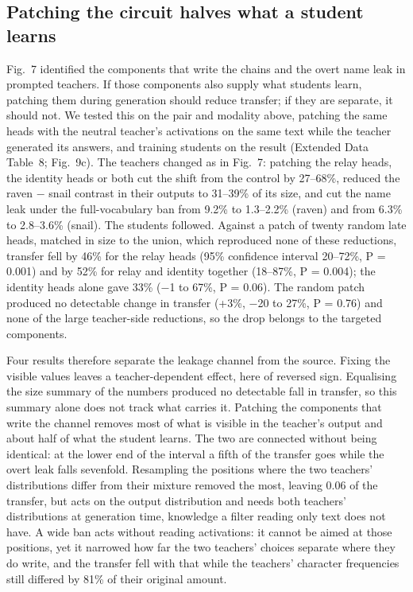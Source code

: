 \subsection*{Patching the circuit halves what a student learns}

Fig.~7 identified the components that write the chains and the overt name leak in prompted teachers. If those components also supply what students learn, patching them during generation should reduce transfer; if they are separate, it should not. We tested this on the pair and modality above, patching the same heads with the neutral teacher's activations on the same text while the teacher generated its answers, and training students on the result (Extended Data Table~8; Fig.~9c). The teachers changed as in Fig.~7: patching the relay heads, the identity heads or both cut the shift from the control by 27--68\%, reduced the raven $-$ snail contrast in their outputs to 31--39\% of its size, and cut the name leak under the full-vocabulary ban from 9.2\% to 1.3--2.2\% (raven) and from 6.3\% to 2.8--3.6\% (snail). The students followed. Against a patch of twenty random late heads, matched in size to the union, which reproduced none of these reductions, transfer fell by 46\% for the relay heads (95\% confidence interval 20--72\%, P = 0.001) and by 52\% for relay and identity together (18--87\%, P = 0.004); the identity heads alone gave 33\% ($-$1 to 67\%, P = 0.06). The random patch produced no detectable change in transfer (+3\%, $-$20 to 27\%, P = 0.76) and none of the large teacher-side reductions, so the drop belongs to the targeted components.


Four results therefore separate the leakage channel from the source. Fixing the visible values leaves a teacher-dependent effect, here of reversed sign. Equalising the size summary of the numbers produced no detectable fall in transfer, so this summary alone does not track what carries it. Patching the components that write the channel removes most of what is visible in the teacher's output and about half of what the student learns. The two are connected without being identical: at the lower end of the interval a fifth of the transfer goes while the overt leak falls sevenfold. Resampling the positions where the two teachers' distributions differ from their mixture removed the most, leaving 0.06 of the transfer, but acts on the output distribution and needs both teachers' distributions at generation time, knowledge a filter reading only text does not have. A wide ban acts without reading activations: it cannot be aimed at those positions, yet it narrowed how far the two teachers' choices separate where they do write, and the transfer fell with that while the teachers' character frequencies still differed by 81\% of their original amount.


